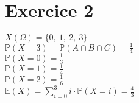\documentclass[td3.tex]{subfiles}
\begin{document}
\section{Exercice 2}
$X(\Omega) = \{ 0,~1,~2,~3 \}$ \\
$\mathbb{P}(X = 3) = \mathbb{P}(A \cap B \cap C) = \frac{1}{4}$ \\
$\mathbb{P}(X = 0) = \frac{1}{3}$ \\
$\mathbb{P}(X = 1) = \frac{1}{4}$ \\
$\mathbb{P}(X = 2) = \frac{1}{6}$ \\
$\mathbb{E}(X) = \sum_{i=0}^{3} i\cdot \mathbb{P}(X=i) = \frac{4}{3}$
\end{document}
